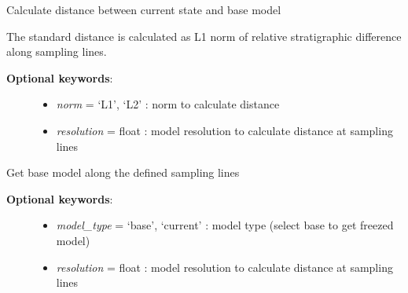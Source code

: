 \documentclass[a4paper,10pt,english]{sphinxmanual}
\begin{document}
\begin{fulllineitems}
\begin{fulllineitems}
\begin{description}
\begin{itemize}
\end{itemize}

\end{description}

\end{fulllineitems}


\begin{fulllineitems}
\label{pynoddy:pynoddy.experiment.SensitivityAnalysis.SensitivityAnalysis.distance}
Calculate distance between current state and base model

The standard distance is calculated as L1 norm of relative stratigraphic difference
along sampling lines.
\begin{description}
\item[{\textbf{Optional keywords}:}] \leavevmode\begin{itemize}
\item {} 
\emph{norm} = `L1', `L2' : norm to calculate distance

\item {} 
\emph{resolution} = float : model resolution to calculate distance at sampling lines

\end{itemize}

\end{description}

\end{fulllineitems}


\begin{fulllineitems}
\label{pynoddy:pynoddy.experiment.SensitivityAnalysis.SensitivityAnalysis.get_model_lines}
Get base model along the defined sampling lines
\begin{description}
\item[{\textbf{Optional keywords}:}] \leavevmode\begin{itemize}
\item {} 
\emph{model\_type} = `base', `current' : model type (select base to get freezed model)

\item {} 
\emph{resolution} = float : model resolution to calculate distance at sampling lines


\end{itemize}
\end{description}
\end{fulllineitems}
\end{fulllineitems}
\end{document}
